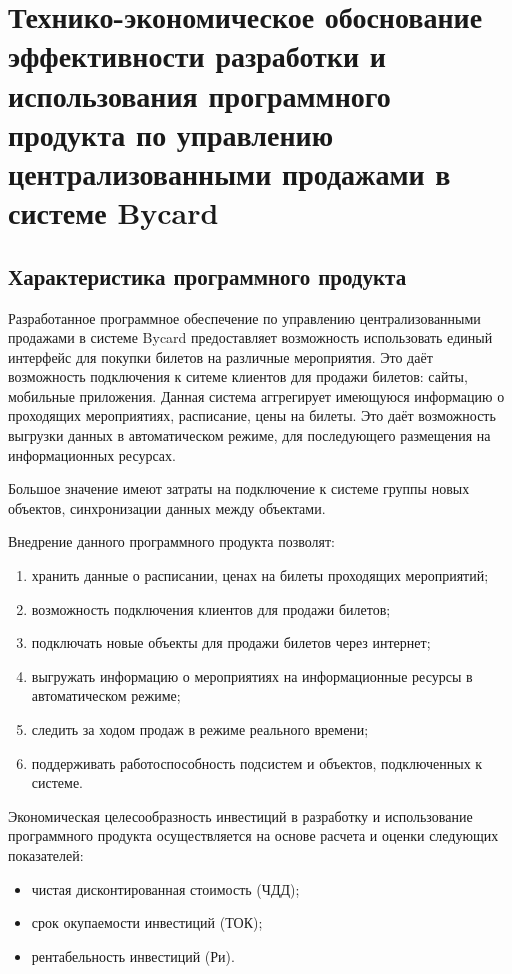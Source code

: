 \section{Технико-экономическое обоснование эффективности разработки и использования программного продукта по управлению централизованными продажами в системе Bycard}

\subsection{Характеристика программного продукта}
Разработанное программное обеспечение по управлению централизованными продажами в системе Bycard предоставляет возможность использовать единый интерфейс для покупки билетов на различные мероприятия. Это даёт возможность подключения к ситеме клиентов для продажи билетов: сайты, мобильные приложения. Данная система аггрегирует имеющуюся информацию о проходящих мероприятиях, расписание, цены на билеты. Это даёт возможность выгрузки данных в автоматическом режиме, для последующего размещения на информационных ресурсах.

Большое значение имеют затраты на подключение к системе группы новых объектов, синхронизации данных между объектами.

Внедрение данного программного продукта позволят:
\begin{enumerate}
    \item хранить данные о расписании, ценах на билеты проходящих мероприятий;
    \item возможность подключения клиентов для продажи билетов;
    \item подключать новые объекты для продажи билетов через интернет;
    \item выгружать информацию о мероприятиях на информационные ресурсы в автоматическом режиме;
    \item следить за ходом продаж в режиме реального времени;
    \item поддерживать работоспособность подсистем и объектов, подключенных к системе.
\end{enumerate}

Экономическая целесообразность инвестиций в разработку и использование программного продукта осуществляется на основе расчета и оценки следующих показателей:
\begin{itemize}
    \item чистая  дисконтированная стоимость (ЧДД);
    \item срок окупаемости инвестиций (ТОК);
    \item рентабельность инвестиций (Ри).
\end{itemize}

